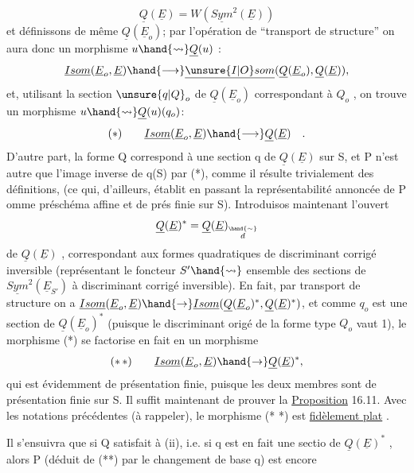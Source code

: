 
\[ \underline{Q}(\underline{E}) =W(\underline{Sym}^2(\underline{E})) \]
et définissons de même $\underline{Q}(\underline{E}_o)$; par l'opération de ``transport de
structure'' on aura donc un morphisme $u \hand{\rightsquigarrow} \underline{Q}(u)$ :
\[ \underline{Isom}(\underline{E}_o,\underline{E}) \hand{\longrightarrow} \underline{\unsure{I|O}som}(\underline{Q}(\underline{E}_o),\underline{Q}(\underline{E})), \]
et, utilisant la section $\unsure{q|Q}_o$ de $\underline{Q}(\underline{E}_o)$ correspondant à $Q_o$ , on trouve un
morphisme $u \hand{\rightsquigarrow} \underline{Q}(u)(q_o)$:
\[ (*) \qquad \underline{Isom}(\underline{E}_o,\underline{E}) \hand{\longrightarrow} \underline{Q}(\underline{E}) \quad . \]
D'autre part, la forme Q  correspond à une section q de $\underline{Q}(\underline{E})$ sur S,
et P n'est autre que l'image inverse de q(S) par (*), comme il résulte
trivialement des définitions, (ce qui, d'ailleurs, établit en passant la
représentabilité annoncée de P omme préschéma affine et de prés finie
sur S). Introduisos maintenant l'ouvert 
\[ \underline{Q}(\underline{E})^* = \underline{Q}(\underline{E})_{\overset{\hand{\sim}}{d}} \]
de $\underline{Q}(\underline{E})$ , correspondant aux formes quadratiques de discriminant corrigé
inversible (représentant le foncteur $S' \hand{\rightsquigarrow}$ ensemble des 
sections de $\underline{Sym}^2(\underline{E}_{S'})$ à discriminant corrigé inversible). En fait,
par transport de structure on a $\underline{Isom}(\underline{E}_o,\underline{E}) \hand{\rightarrow} \underline{Isom}(\underline{Q}(\underline{E}_o)^*,\underline{Q}(\underline{E})^*)$, et
comme $q_o$ est une section de $\underline{Q}(\underline{E}_o)^*$ (puisque le discriminant origé de
la forme type $Q_o$ vaut 1), le morphisme (*) se factorise en fait en un
morphisme
\[ (*\,*) \qquad \underline{Isom}(\underline{E}_o,\underline{E}) \hand{\rightarrow} \underline{Q}(\underline{E})^* , \]
qui est évidemment de présentation finie, puisque les deux membres sont de
présentation finie sur S. Il suffit maintenant de prouver la
 \uline{Proposition} 16.11. Avec les notations précédentes (à rappeler),
le morphisme (* *) est \uline{fidèlement plat} .

Il s'ensuivra que si Q satisfait à (ii), i.e. si q est en fait une sectio
de $\underline{Q}(\underline{E})^*$ , alors P (déduit de (**) par le changement de base q) est encore

